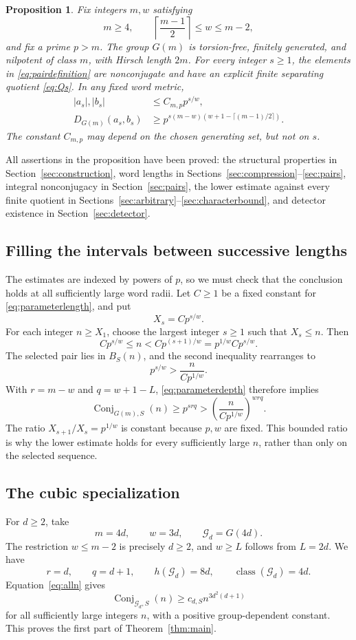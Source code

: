 \documentclass[11pt]{article}
\numberwithin{equation}{section}
\newtheorem{proposition}[theorem]{Proposition}
\theoremstyle{definition}
\theoremstyle{remark}
\newcommand{\Conj}{\operatorname{Conj}}
\begin{document}
\begin{proposition}\label{prop:parameterbound}
Fix integers $m,w$ satisfying
\[
m\ge4,\qquad
\left\lceil\frac{m-1}{2}\right\rceil\le w\le m-2,
\]
and fix a prime $p>m$. The group $G(m)$ is torsion-free, finitely generated, and nilpotent of class $m$, with Hirsch length $2m$. For every integer $s\ge1$, the elements in \eqref{eq:pairdefinition} are nonconjugate and have an explicit finite separating quotient \eqref{eq:Qs}. In any fixed word metric,
\begin{align}
|a_s|,|b_s|&\le C_{m,p}p^{s/w},\label{eq:parameterlength}\\
D_{G(m)}(a_s,b_s)&\ge p^{s(m-w)(w+1-\lceil(m-1)/2\rceil)}.\label{eq:parameterdepth}
\end{align}
The constant $C_{m,p}$ may depend on the chosen generating set, but not on $s$.
\end{proposition}

All assertions in the proposition have been proved: the structural properties in Section~\ref{sec:construction}, word lengths in Sections~\ref{sec:compression}--\ref{sec:pairs}, integral nonconjugacy in Section~\ref{sec:pairs}, the lower estimate against every finite quotient in Sections~\ref{sec:arbitrary}--\ref{sec:characterbound}, and detector existence in Section~\ref{sec:detector}.

\subsection{Filling the intervals between successive lengths}
The estimates are indexed by powers of $p$, so we must check that the conclusion holds at all sufficiently large word radii. Let $C\ge1$ be a fixed constant for \eqref{eq:parameterlength}, and put
\[
X_s=Cp^{s/w}.
\]
For each integer $n\ge X_1$, choose the largest integer $s\ge1$ such that $X_s\le n$. Then
\[
Cp^{s/w}\le n<Cp^{(s+1)/w}=p^{1/w}Cp^{s/w}.
\]
The selected pair lies in $B_S(n)$, and the second inequality rearranges to
\[
p^{s/w}>\frac{n}{Cp^{1/w}}.
\]
With $r=m-w$ and $q=w+1-L$, \eqref{eq:parameterdepth} therefore implies
\begin{equation}\label{eq:alln}
\Conj_{G(m),S}(n)\ge p^{srq}
>\left(\frac{n}{Cp^{1/w}}\right)^{wrq}.
\end{equation}
The ratio $X_{s+1}/X_s=p^{1/w}$ is constant because $p,w$ are fixed. This bounded ratio is why the lower estimate holds for every sufficiently large $n$, rather than only on the selected sequence.

\subsection{The cubic specialization}
For $d\ge2$, take
\[
m=4d,\qquad w=3d,\qquad \mathcal G_d=G(4d).
\]
The restriction $w\le m-2$ is precisely $d\ge2$, and $w\ge L$ follows from $L=2d$. We have
\[
r=d,\qquad q=d+1,\qquad h(\mathcal G_d)=8d,
\qquad \operatorname{class}(\mathcal G_d)=4d.
\]
Equation~\eqref{eq:alln} gives
\[
\Conj_{\mathcal G_d,S}(n)\ge c_{d,S}n^{3d^2(d+1)}
\]
for all sufficiently large integers $n$, with a positive group-dependent constant. This proves the first part of Theorem~\ref{thm:main}.
\end{document}
